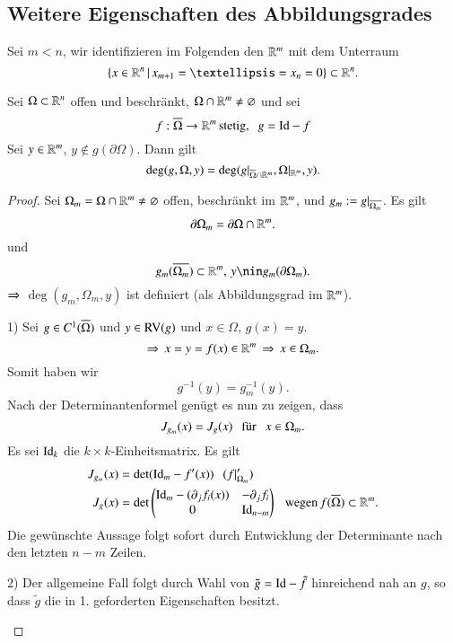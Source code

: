 \subsection{Weitere Eigenschaften des Abbildungsgrades}

Sei $m<n$, wir identifizieren im Folgenden den $\mathbb{R}^m$ mit dem Unterraum
\[
    \{x\in \R^n \, | \, x_{m+1}=…=x_n=0\}\subset \R^n.
\]

\begin{theorem}\label{2.14}
    Sei $\Omega \subset \mathbb{R}^n$ offen und beschränkt, $\Omega \cap \mathbb{R}^m \neq \varnothing$ und sei
    \[
        f:\overline \Omega \rightarrow \mathbb{R}^m\, \text{stetig,} \hspace{.25cm} g=\mathrm{Id}-f
    \]
    Sei $y\in \mathbb{R}^m$, $y\nin g(\partial \Omega)$. Dann gilt
    \[
        \deg(g,\Omega,y)=\deg(g|_{\overline{\Omega}\cap\mathbb{R}^m},\Omega|_{\mathbb{R}^m},y).
    \]
\end{theorem}

\begin{proof}
    Sei $\Omega_m=\Omega\cap\mathbb{R}^m\neq \varnothing$ offen, beschränkt im $\mathbb{R}^m$, und
    $g_m:=g|_{\overline{\Omega_m}}$. Es gilt
    \[
        \partial \Omega_m=\partial\Omega\cap\mathbb{R}^m.
    \]
    und
    \[
        g_m(\ol{\Omega_m})\subset\R^m,\, y\nin g_m(\partial\Omega_m).
    \]
    $\Rightarrow$ $\deg(g_m,\Omega_m,y)$ ist definiert (als Abbildungsgrad im $\mathbb{R}^m$).
    \begin{description}
        \item{1)}
        Sei $g\in C^1(\overline \Omega)$ und $y\in \mathrm{RV}(g)$ und $x\in \Omega$, $g(x)=y$.
        \[
        \Rightarrow \, x=y=f(x)\in \mathbb{R}^m \, \Rightarrow \, x\in \Omega_m.
        \]
        Somit haben wir
        \[
            g^{-1}(y)=g_m^{-1}(y).
        \]
        Nach der Determinantenformel genügt es nun zu zeigen, dass
        \[
            J_{g_m}(x)=J_g(x) \hspace{.25cm} \text{für} \hspace{.25cm} x\in \Omega_m.
        \]
        Es sei $\mathrm{Id}_k$ die $k\times k$-Einheitsmatrix. Es gilt
        \begin{align*}
            J_{g_m}(x)&=\det(\mathrm{Id}_m-f'(x)) \hspace{.25cm} (f|_{\Omega_m}')\\
            J_g(x)&= \det\begin{pmatrix} \mathrm{Id}_m-(\partial_jf_i(x)) & -\partial_jf_i\\
            0& \mathrm{Id}_{n-m}\end{pmatrix} \hspace{.25cm} \text{wegen} \, f(\overline\Omega)\subset\mathbb{R}^m.
        \end{align*}
        Die gewünschte Aussage folgt sofort durch Entwicklung der Determinante nach den letzten
        $n-m$ Zeilen.
        \item{2)}
        Der allgemeine Fall folgt durch Wahl von $\tilde g=\mathrm{Id}-\tilde f$ hinreichend nah an $g$, so dass
        $\tilde g$ die in 1. geforderten Eigenschaften besitzt.
    \end{description}
    \[ \]
\end{proof}
